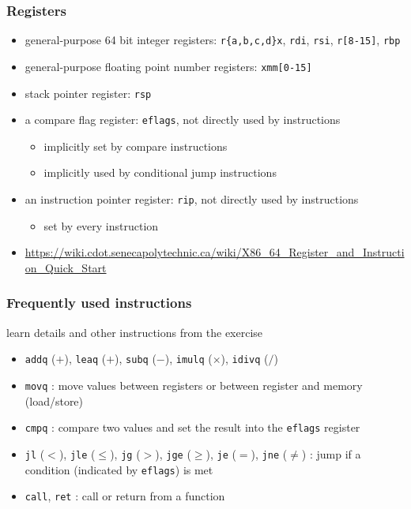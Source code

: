 \documentclass[12pt,dvipdfmx]{beamer}
\newcommand{\ao}[1]{{\color{blue}#1}}
\begin{document}
\begin{frame}
  \frametitle{Registers}
\begin{itemize}
\item general-purpose 64 bit integer registers:
  \ao{\tt r\{a,b,c,d\}x}, \ao{\tt rdi}, \ao{\tt rsi}, \ao{\tt r[8-15]},
  \ao{\tt rbp}
\item general-purpose floating point number registers:
  \ao{\tt xmm[0-15]}
\item stack pointer register: \ao{\tt rsp}
\item a compare flag register: \ao{\tt eflags}, not directly used by instructions
  \begin{itemize}
  \item implicitly set by compare instructions
  \item implicitly used by conditional jump instructions
  \end{itemize}
\item an instruction pointer register: \ao{\tt rip},
  not directly used by instructions
  \begin{itemize}
  \item set by every instruction
  \end{itemize}
\item \url{https://wiki.cdot.senecapolytechnic.ca/wiki/X86_64_Register_and_Instruction_Quick_Start}
\end{itemize}
\end{frame}

\begin{frame}
  \frametitle{Frequently used instructions}
learn details and other instructions from the exercise    
\begin{itemize}
\item \ao{\tt addq} ($+$), \ao{\tt leaq} ($+$), \ao{\tt subq} ($-$), \ao{\tt imulq} ($\times$), \ao{\tt idivq} ($/$)
\item \ao{\tt movq} : move values between registers or between register and memory (load/store)
\item \ao{\tt cmpq} : compare two values and set the result into
  the \ao{\tt eflags} register
\item \ao{\tt jl} ($<$), \ao{\tt jle} ($\leq$), \ao{\tt jg} ($>$),
  \ao{\tt jge} ($\geq$), \ao{\tt je} ($=$), \ao{\tt jne} ($\neq$) :
  jump if a condition (indicated by \ao{\tt eflags}) is met
\item \ao{\tt call}, \ao{\tt ret} : call or return from a function
\end{itemize}
\end{frame}
\end{document}
